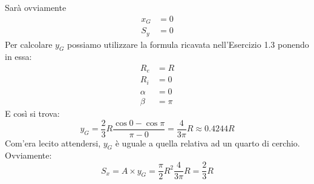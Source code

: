\noindent Sarà ovviamente 
\begin{align*}
x_G &= 0 \\ 
S_y &= 0
\end{align*}
Per calcolare $y_G$ possiamo utilizzare la formula ricavata nell'Esercizio 1.3 ponendo in essa: 
\begin{align*}
R_e &= R \\ 
R_i &= 0 \\
\alpha &=0 \\ 
\beta &=\pi
\end{align*}
E così si trova:
\begin{equation*}
y_G = \frac{2}{3}R\frac{\cos 0 - \cos\pi}{\pi-0} = \frac{4}{3\pi}R \approx 0.4244R
\end{equation*}
Com'era lecito attendersi, $y_G$ è uguale a quella relativa ad un quarto di cerchio. Ovviamente: 
\begin{equation*}
S_x = A\times y_G = \frac{\pi}{2}R^2\frac{4}{3\pi}R = \frac{2}{3}R
\end{equation*}
\clearpage
